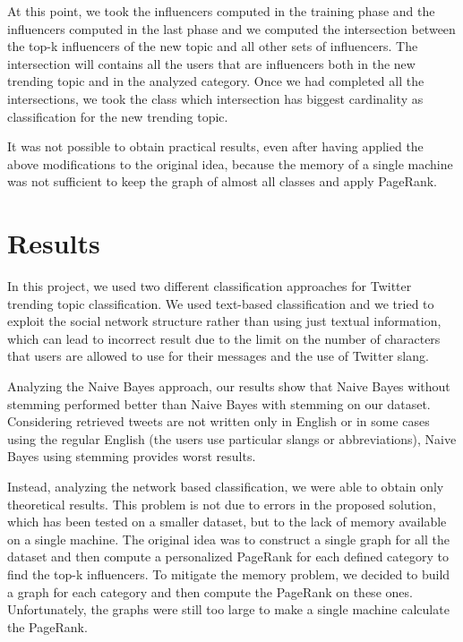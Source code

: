 \documentclass[journal,11pt]{vgtc}
\begin{document}
At this point, we took the influencers computed in the training phase and the influencers computed in the
last phase and we computed the intersection between the top-k influencers of the new topic and
all other sets of influencers.
The intersection will contains all the users that are influencers both
in the new trending topic and in the analyzed category.
Once we had completed all the intersections, we took the class which intersection has biggest cardinality
as classification for the new trending topic.

It was not possible to obtain practical results, even after having applied the above modifications
to the original idea, because the memory of a single machine was not sufficient to keep the graph of almost all
classes and apply PageRank.

\section{Results}
In this project, we used two different classification approaches for Twitter trending topic classification.
We used text-based classification and we tried to exploit the social network structure rather than
using just textual information, which can lead to incorrect result due to the limit on the number of characters
that users are allowed to use for their messages and the use of Twitter slang.

Analyzing the Naive Bayes approach, our results show that Naive Bayes without stemming
performed better than Naive Bayes with stemming on our dataset. Considering retrieved tweets are not
written only in English or in some cases using the regular English (the users use particular slangs or abbreviations),
Naive Bayes using stemming provides worst results.

Instead, analyzing the network based classification, we were able to obtain only theoretical results.
This problem is not due to errors in the proposed solution, which has been tested on a smaller dataset,
but to the lack of memory available on a single machine.
The original idea was to construct a single graph for all the dataset and then compute a personalized
PageRank for each defined category to find the top-k influencers. To mitigate the memory problem, we decided
to build a graph for each category and then compute the PageRank on these ones.
Unfortunately, the graphs were still too large to make a single machine calculate the PageRank.








\end{document}
